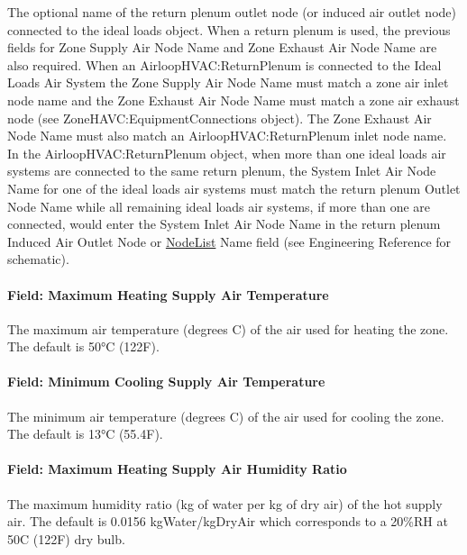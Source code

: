 The optional name of the return plenum outlet node (or induced air outlet node) connected to the ideal loads object. When a return plenum is used, the previous fields for Zone Supply Air Node Name and Zone Exhaust Air Node Name are also required. When an AirloopHVAC:ReturnPlenum is connected to the Ideal Loads Air System the Zone Supply Air Node Name must match a zone air inlet node name and the Zone Exhaust Air Node Name must match a zone air exhaust node (see ZoneHAVC:EquipmentConnections object). The Zone Exhaust Air Node Name must also match an AirloopHVAC:ReturnPlenum inlet node name. In the AirloopHVAC:ReturnPlenum object, when more than one ideal loads air systems are connected to the same return plenum, the System Inlet Air Node Name for one of the ideal loads air systems must match the return plenum Outlet Node Name while all remaining ideal loads air systems, if more than one are connected, would enter the System Inlet Air Node Name in the return plenum Induced Air Outlet Node or \hyperref[nodelist]{NodeList} Name field (see Engineering Reference for schematic).

\paragraph{Field: Maximum Heating Supply Air Temperature}\label{field-maximum-heating-supply-air-temperature-000}

The maximum air temperature (degrees \si{C}) of the air used for heating the zone. The default is 50°\si{C} (122F).

\paragraph{Field: Minimum Cooling Supply Air Temperature}\label{field-minimum-cooling-supply-air-temperature-000}

The minimum air temperature (degrees \si{C}) of the air used for cooling the zone. The default is 13°\si{C} (55.4F).

\paragraph{Field: Maximum Heating Supply Air Humidity Ratio}\label{field-maximum-heating-supply-air-humidity-ratio-000}

The maximum humidity ratio (kg of water per kg of dry air) of the hot supply air. The default is 0.0156 kgWater/kgDryAir which corresponds to a 20\%RH at 50\si{C} (122F) dry bulb.

